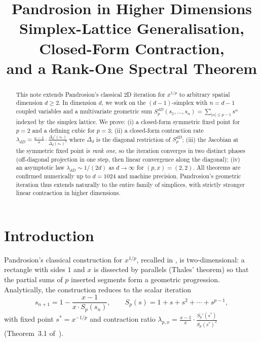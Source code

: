 \documentclass[11pt,a4paper]{article}
\title{\textbf{Pandrosion in Higher Dimensions}\\[0.3em]
\large Simplex-Lattice Generalisation, Closed-Form Contraction,\\
and a Rank-One Spectral Theorem}
\author{}
\date{}
\theoremstyle{definition}
\theoremstyle{remark}
\begin{document}
\maketitle

\begin{abstract}
This note extends Pandrosion's classical 2D iteration for $x^{1/p}$ to
arbitrary spatial dimension $d \geq 2$.  In dimension $d$, we work on the
$(d-1)$-simplex with $n = d-1$ coupled variables and a multivariate
geometric sum
$S_p^{dD}(s_1, \ldots, s_n) = \sum_{|\alpha| \leq p-1} s^\alpha$
indexed by the simplex lattice.  We prove:
(i) a closed-form symmetric fixed point for $p=2$ and a defining cubic
for $p=3$;
(ii) a closed-form contraction rate $\lambda_{dD} = \frac{x-1}{x} \cdot
\frac{\Delta_d'(s_*)}{\Delta_d(s_*)^2}$ where $\Delta_d$ is the diagonal
restriction of $S_p^{dD}$;
(iii) the Jacobian at the symmetric fixed point is \emph{rank one}, so
the iteration converges in two distinct phases (off-diagonal projection
in one step, then linear convergence along the diagonal);
(iv) an asymptotic law $\lambda_{dD} \sim 1/(2d)$ as $d \to \infty$ for
$(p, x) = (2, 2)$.
All theorems are confirmed numerically up to $d = 1024$ and machine
precision.  Pandrosion's geometric iteration thus extends naturally to
the entire family of simplices, with strictly stronger linear contraction
in higher dimensions.
\end{abstract}

\section{Introduction}

Pandrosion's classical construction for $x^{1/p}$, recalled in
\cite{0pandrosion_pth}, is two-dimensional: a rectangle with sides $1$ and
$x$ is dissected by parallels (Thales' theorem) so that the partial
sums of $p$ inserted segments form a geometric progression.
Analytically, the construction reduces to the scalar iteration
\begin{equation}
  \label{eq:paper0_iter}
  s_{n+1} = 1 - \frac{x - 1}{x \cdot S_p(s_n)},
  \qquad
  S_p(s) = 1 + s + s^2 + \cdots + s^{p-1},
\end{equation}
with fixed point $s^* = x^{-1/p}$ and contraction ratio
$\lambda_{p,x} = \frac{x-1}{x} \cdot \frac{S_p'(s^*)}{S_p(s^*)^2}$
(Theorem~3.1 of~\cite{0pandrosion_pth}).
\end{document}
